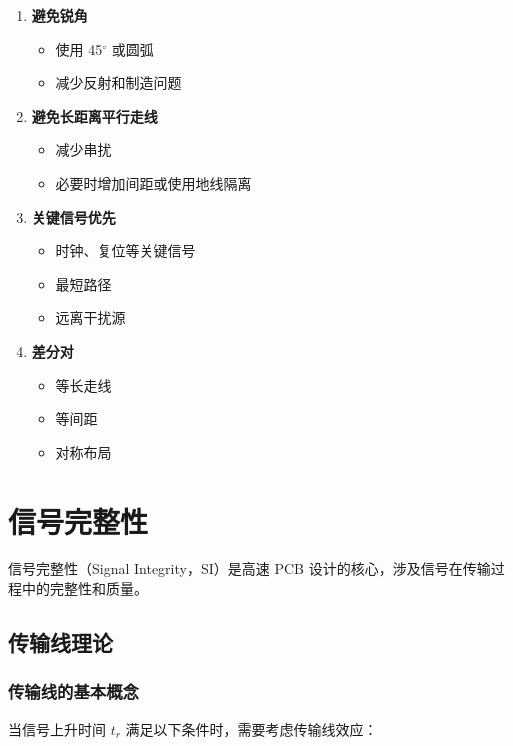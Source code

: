 \begin{enumerate}
  \item \textbf{避免锐角}
    \begin{itemize}
      \item 使用 45$^\circ$ 或圆弧
      \item 减少反射和制造问题
    \end{itemize}

  \item \textbf{避免长距离平行走线}
    \begin{itemize}
      \item 减少串扰
      \item 必要时增加间距或使用地线隔离
    \end{itemize}

  \item \textbf{关键信号优先}
    \begin{itemize}
      \item 时钟、复位等关键信号
      \item 最短路径
      \item 远离干扰源
    \end{itemize}

  \item \textbf{差分对}
    \begin{itemize}
      \item 等长走线
      \item 等间距
      \item 对称布局
    \end{itemize}
\end{enumerate}

\section{信号完整性}

信号完整性（Signal Integrity，SI）是高速 PCB 设计的核心，涉及信号在传输过程中的完整性和质量。

\subsection{传输线理论}

\subsubsection{传输线的基本概念}

当信号上升时间 $t_r$ 满足以下条件时，需要考虑传输线效应：

